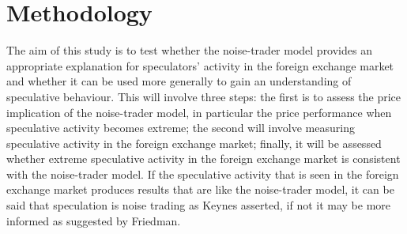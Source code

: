 \documentclass[12pt, a4paper, oneside]{article} %
\begin{document}
\section{Methodology}
The aim of this study is to test whether the noise-trader model provides an appropriate explanation for speculators' activity in the  foreign exchange market and whether it can be used more generally to gain an understanding of speculative behaviour.   This will involve three steps:  the first is to assess the price implication of the noise-trader model, in particular the price performance when speculative activity becomes extreme; the second will involve measuring speculative activity in the foreign exchange market; finally, it will be assessed whether extreme speculative activity in the foreign exchange market is consistent with the noise-trader model.  If the speculative activity that is seen in the foreign exchange market produces results that are like the noise-trader model, it can be said that speculation is noise trading as Keynes asserted, if not it may be more informed as suggested by Friedman.  

\end{document}
